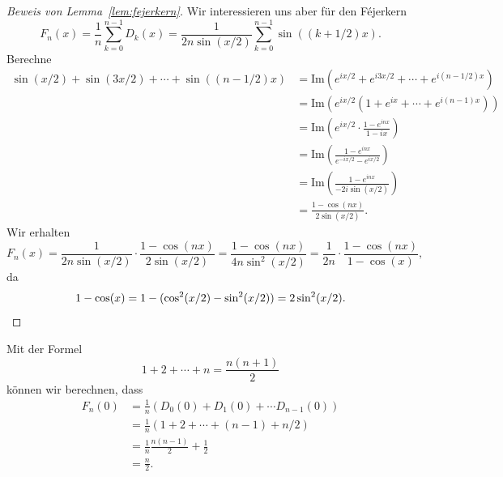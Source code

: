 \documentclass[../main.tex]{subfiles}
\begin{document}
\begin{proof}[Beweis von Lemma~\ref{lem:fejerkern}]
  Wir interessieren uns aber für den Féjerkern
  \[
    F_n(x) = \frac{1}{n} \sum_{k=0}^{n-1} D_k(x)
    =\frac{1}{2n \sin(x/2)} \sum_{k=0}^{n-1} \sin((k + 1/2)x).
  \]
  Berechne
  \begin{align*}
     \sin(x/2) + \sin(3x/2) + \cdots + \sin((n-1/2)x)
     &= \text{Im}(e^{ix/2} + e^{i3x/2} + \cdots + e^{i(n-1/2)x})  \\
     &= \text{Im}(e^{ix/2}(1 + e^{ix} + \cdots + e^{i(n-1)x}))\\
     &= \text{Im} \left( e^{ix/2} \cdot \frac{1 - e^{inx}}{1 - ix} \right)\\
     &= \text{Im} \left( \frac{1 - e^{inx}}{e^{-ix/2} - e^{ix/2}} \right)\\
     &= \text{Im} \left( \frac{1 - e^{inx}}{-2i \sin(x/2)} \right)\\
     &= \frac{1- \cos(nx)}{2 \sin(x/2)}.
  \end{align*}
  Wir erhalten
  \[
    F_n(x) = \frac{1}{2n \sin(x/2)} \cdot \frac{1 - \cos(nx)}{2 \sin(x/2)}
    =\frac{1 - \cos(nx)}{4n \sin^2(x/2)}
    = \frac{1}{2n} \cdot \frac{1 - \cos(nx)}{1 - \cos(x)},
  \]
  da
  \[
    1 - \cos(x) = 1 - (\cos^2(x/2) - \sin^2(x/2))
    = 2 \sin^2(x/2). \qedhere
  \]
\end{proof}

Mit der Formel
\[
  1 + 2 + \cdots + n = \frac{n(n+1)}{2}
\]
können wir berechnen, dass
\begin{align*}
   F_n(0) 
   & = \frac{1}{n} (D_0(0) + D_1(0) + \cdots D_{n-1}(0)) \\
   &= \frac{1}{n}(1 + 2 + \cdots + (n-1) + n/2) \\
   &= \frac{1}{n} \frac{n(n-1)}{2} + \frac{1}{2}\\
   &= \frac{n}{2}.
\end{align*}
\end{document}
